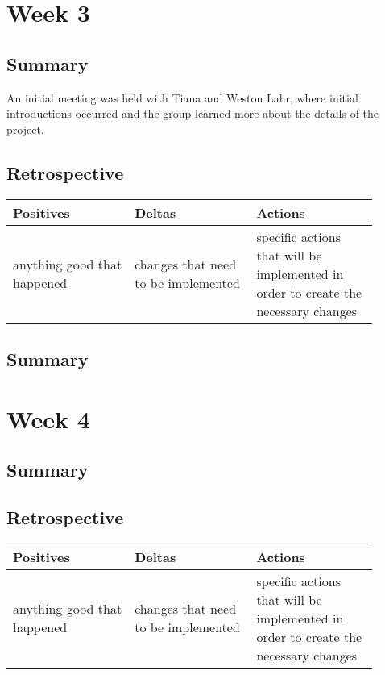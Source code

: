 \documentclass[letterpaper,10pt,serif,draftclsnofoot,onecolumn,compsoc,titlepage]{IEEEtran}
\begin{document}
\section{Week 3}

\subsection{Summary}

An initial meeting was held with Tiana and Weston Lahr, where initial introductions 
occurred and the group learned more about the details of the project. 

\subsection{Retrospective}

\begin{tabular}{|p{0.3\linewidth}|p{0.3\linewidth}|p{0.3\linewidth}|}
   \hline
   \textbf{Positives} & \textbf{Deltas} & \textbf{Actions}\\ 
   \hline
   anything good that happened 
   & 
   changes that need to be implemented 
   & 
   specific actions that will be implemented in order to create the necessary 
   changes \\
   \hline
\end{tabular}

\subsection{Summary}

\section{Week 4}

\subsection{Summary}


\subsection{Retrospective}

\begin{tabular}{|p{0.3\linewidth}|p{0.3\linewidth}|p{0.3\linewidth}|}
   \hline
   \textbf{Positives} & \textbf{Deltas} & \textbf{Actions}\\ 
   \hline
   anything good that happened & changes that need to be implemented & specific actions that will be implemented in order to create the necessary changes \\
   \hline
\end{tabular}
\end{document}
